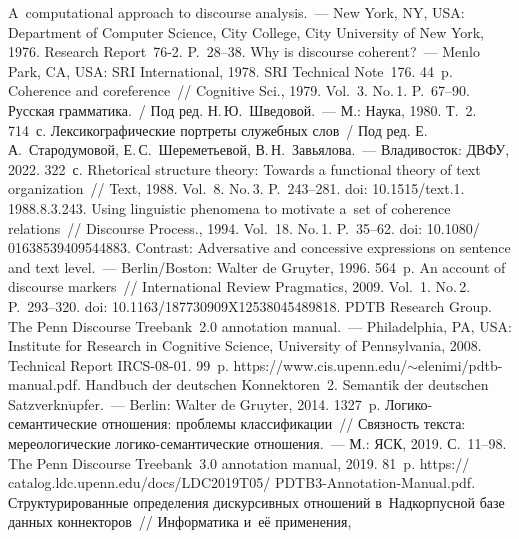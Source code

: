 \begin{multicols}{2}
{{\begin{thebibliography}{99}
 A~computational approach to discourse analysis.~--- 
New York, NY, USA: Department of Computer Science, City College, City University of New 
York, 1976. Research Report~76-2. P.~28--38.
 Why is discourse coherent?~--- Menlo Park, CA, 
USA: SRI International, 1978.  SRI Technical Note~176. 44~p.
 Coherence and coreference~// Cognitive Sci., 1979. Vol.~3. No.\,1.  
P.~67--90. 
Русская грамматика.~/ Под ред. Н.\,Ю.~Шведовой.~--- М.: Наука, 1980. Т.~2. 714~с.
Лексикографические порт\-ре\-ты служебных слов~/ Под ред. Е.\,А.~Ста\-ро\-ду\-мо\-вой, 
Е.\,С.~Ше\-ре\-меть\-евой, В.\,Н.~Завья\-ло\-ва.~--- Владивосток: ДВФУ, 2022. 322~с.
 Rhetorical structure theory: Towards a functional theory of text 
organization~// Text, 1988. Vol.~8. No.\,3. P.~243--281. doi: 10.1515/text.1. 1988.8.3.243.
 Using linguistic phenomena to motivate a~set of coherence relations~// 
Discourse Process., 1994. Vol.~18. No.\,1. P.~35--62. doi: 10.1080/ 01638539409544883.
 Contrast: Adversative and concessive expressions on sentence and text  
level.~--- Berlin/Boston: Walter de Gruyter, 1996. 564~p.
 An account of discourse markers~// International Review Pragmatics, 2009. Vol.~1. 
No.\,2. P.~293--320. doi: 10.1163/187730909X12538045489818.
PDTB Research Group. The Penn Discourse Treebank~2.0 annotation manual.~--- Philadelphia, PA, USA: 
Institute for Research in Cognitive Science, University of Pennsylvania, 2008.  Technical Report 
IRCS-08-01. 99~p. {\sf https://www.cis.upenn.edu/$\sim$elenimi/pdtb-manual.pdf}.
 Handbuch der deutschen Konnektoren~2. 
Semantik der deutschen Satzverkn$\ddot{\mbox{u}}$pfer.~--- Berlin: Walter de Gruyter, 2014. 1327~p.
 Ло\-ги\-ко-се\-ман\-ти\-че\-ские отношения: проблемы 
классификации~// Связ\-ность текста: мереологические ло\-ги\-ко-се\-ман\-ти\-че\-ские 
отношения.~--- М.: ЯСК, 2019. С.~11--98.
 The Penn Discourse Treebank~3.0 annotation 
manual, 2019. 81~p. {\sf  
https:// catalog.ldc.upenn.edu/docs/LDC2019T05/ PDTB3-Annotation-Manual.pdf}.
 Структурированные определения дискурсивных 
отношений в~Надкорпусной базе данных коннекторов~// Информатика и~её применения, 

\end{thebibliography}}}
\end{multicols}
